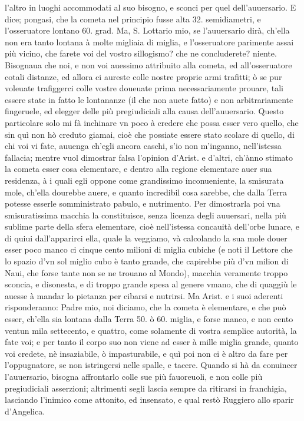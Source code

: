 \documentclass[11pt,twoside,openany]{book}
\begin{document}
l'altro in luoghi accommodati al suo bisogno, e sconci per quel dell'auuersario. E dice; pongasi, che la cometa nel principio fusse alta 32. semidiametri, e l'osseruatore lontano 60. grad. Ma, S. Lottario mio, se l'auuersario dirà, ch'ella non era tanto lontana à molte migliaia di miglia, e l'osseruatore parimente assai più vicino, che farete voi del vostro sillogismo? che ne concluderete? niente. Bisognaua che noi, e non voi auessimo attribuito alla cometa, ed all'osseruatore cotali distanze, ed allora ci aureste colle nostre proprie armi trafitti; ò se pur voleuate trafiggerci colle vostre doueuate prima necessariamente prouare, tali essere state in fatto le lontananze (il che non auete fatto) e non arbitrariamente fingeruele, ed elegger delle più pregiudiciali alla causa dell'auuersario. Questo particolare solo mi fà inchinare vn poco à credere che possa esser vero quello, che sin quì non hò creduto giamai, cioè che possiate essere stato scolare di quello, di chi voi vi fate, auuenga ch'egli ancora caschi, s'io non m'inganno, nell'istessa fallacia; mentre vuol dimostrar falsa l'opinion d'Arist. e d'altri, ch'ànno stimato la cometa esser cosa elementare, e dentro alla regione elementare auer sua residenza, à i quali egli oppone come grandissimo inconueniente, la smisurata mole, ch'ella dourebbe auere, e quanto incredibil cosa sarebbe, che dalla Terra potesse esserle somministrato pabulo, e nutrimento. Per dimostrarla poi vna smisuratissima macchia la constituisce, senza licenza degli auuersari, nella più sublime parte della sfera elementare, cioè nell'istessa concauità dell'orbe lunare, e di quiui dall'apparirci ella, quale la veggiamo, và calcolando la sua mole douer esser poco manco ci cinque cento milioni di miglia cubiche (e noti il Lettore che lo spazio d'vn sol miglio cubo è tanto grande, che capirebbe più d'vn milion di Naui, che forse tante non se ne trouano al Mondo), macchia veramente troppo sconcia, e disonesta, e di troppo grande spesa al genere vmano, che di quaggiù le auesse à mandar lo pietanza per cibarsi e nutrirsi. Ma Arist. e i suoi aderenti risponderanno: Padre mio, noi diciamo, che la cometa è elementare, e che può esser, ch'ella sia lontana dalla Terra 50. ò 60. miglia, e forse manco, e non cento ventun mila settecento, e quattro, come solamente di vostra semplice autorità, la fate voi; e per tanto il corpo suo non viene ad esser à mille miglia grande, quanto voi credete, nè insaziabile, ò impasturabile, e quì poi non ci è altro da fare per l'oppugnatore, se non istringersi nelle spalle, e tacere. Quando si hà da conuincer l'auuersario, bisogna affrontarlo colle sue più fauoreuoli, e non colle più pregiudiciali asserzioni; altrimenti segli lascia sempre da ritirarsi in franchigia, lasciando l'inimico come attonito, ed insensato, e qual restò Ruggiero allo sparir d'Angelica.
\end{document}
